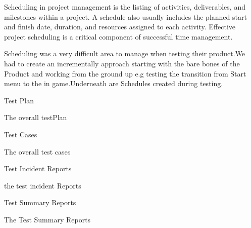 Scheduling in project management is the listing of activities, deliverables, and milestones within a project. A schedule also usually includes the planned start and finish date, duration, and resources assigned to each activity. Effective project scheduling is a critical component of successful time management.

Scheduling was a very difficult area to manage when testing their product.We had to create an
incrementally  approach starting with the bare bones of the Product and working from the ground up
e.g testing the transition from Start menu to the in game.Underneath are Schedules created during
testing.


\begin{center}
\centerline{Test Plan}
\end{center}
The overall testPlan



\begin{center}
\centerline{Test Cases}
\end{center}
The overall test cases


\begin{center}
\centerline{Test Incident Reports}
\end{center}
the test incident Reports



\begin{center}
\centerline{Test Summary Reports}
\end{center}
The Test Summary Reports

